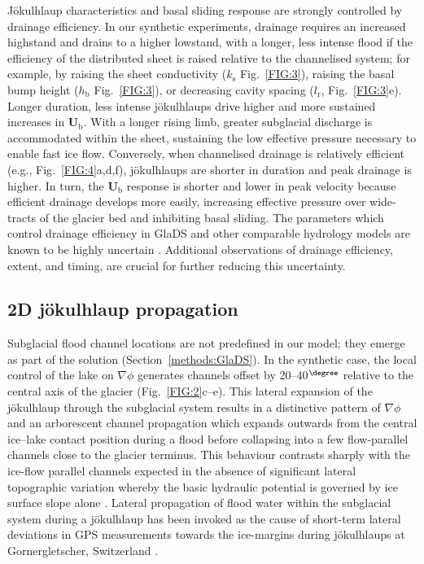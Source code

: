 \documentclass[tc, manuscript]{copernicus}
\begin{document}
Jökulhlaup characteristics and basal sliding response are strongly controlled by drainage efficiency. In our synthetic experiments, drainage requires an increased highstand and drains to a higher lowstand, with a longer, less intense flood if the efficiency of the distributed sheet is raised relative to the channelised system; for example, by raising the sheet conductivity ($k_{\mathrm{s}}$ Fig.~\ref{FIG:3}), raising the basal bump height ($h_{\mathrm{b}}$ Fig.~\ref{FIG:3}), or decreasing cavity spacing ($l_{\mathrm{r}}$, Fig.~\ref{FIG:3}e). Longer duration, less intense jökulhlaups drive higher and more sustained increases in $\mathbf{U}_{\mathrm{b}}$. With a longer rising limb, greater subglacial discharge is accommodated within the sheet, sustaining the low effective pressure necessary to enable fast ice flow. Conversely, when channelised drainage is relatively efficient (e.g., Fig.~\ref{FIG:4}a,d,f), jökulhlaups are shorter in duration and peak drainage is higher. In turn, the $\mathbf{U}_{\mathrm{b}}$ response is shorter and lower in peak velocity because efficient drainage develops more easily, increasing effective pressure over wide-tracts of the glacier bed and inhibiting basal sliding. The parameters which control drainage efficiency in GlaDS and other comparable hydrology models are known to be highly uncertain \citep{werder2013modeling}. Additional observations of drainage efficiency, extent, and timing, are crucial for further reducing this uncertainty.

\subsection{2D jökulhlaup propagation}

Subglacial flood channel locations are not predefined in our model; they emerge as part of the solution (Section~\ref{methods:GlaDS}). In the synthetic case, the local control of the lake on $\nabla \phi$ generates channels offset by 20--40$^{\degree}$ relative to the central axis of the glacier (Fig.~\ref{FIG:2}c--e). This lateral expansion of the jökulhlaup through the subglacial system results in a distinctive pattern of $\nabla\phi$ and an arborescent channel propagation which expands outwards from the central ice--lake contact position during a flood before collapsing into a few flow-parallel channels close to the glacier terminus. This behaviour contrasts sharply with the ice-flow parallel channels expected in the absence of significant lateral topographic variation whereby the basic hydraulic potential is governed by ice surface slope alone \citep[e.g., see Figure 2 in][]{werder2013modeling}. Lateral propagation of flood water within the subglacial system during a jökulhlaup has been invoked as the cause of short-term lateral deviations in GPS measurements towards the ice-margins during jökulhlaups at Gornergletscher, Switzerland \citep{sugiyama2007reversal}.
\end{document}
